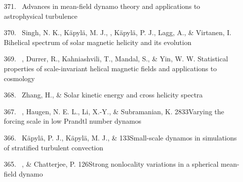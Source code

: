 \begin{itemize}
\item[{371.}~]
\Brandenburg{}
{Advances in mean-field dynamo theory and applications to astrophysical turbulence}

\item[{370.}~]
Singh, N. K., K\"apyl\"a, M. J., \Brandenburg, K\"apyl\"a, P. J., Lagg, A., \& Virtanen, I.
{Bihelical spectrum of solar magnetic helicity and its evolution}

\item[{369.}~]
\Brandenburg, Durrer, R., Kahniashvili, T., Mandal, S., \& Yin, W. W.
{Statistical properties of scale-invariant helical magnetic fields and applications to cosmology}

\item[{368.}~]
Zhang, H., \& \Brandenburg{}
{Solar kinetic energy and cross helicity spectra}

\item[{367.}~]
\Brandenburg, Haugen, N. E. L., Li, X.-Y., \& Subramanian, K.
{2833}{Varying the forcing scale in low Prandtl number dynamos}

\item[{366.}~]
K\"apyl\"a, P. J., K\"apyl\"a, M. J., \& \Brandenburg{}
{133}{Small-scale dynamos in simulations of stratified turbulent convection}

\item[{365.}~]
\Brandenburg, \& Chatterjee, P.
{126}{Strong nonlocality variations in a spherical mean-field dynamo}


\end{itemize}
